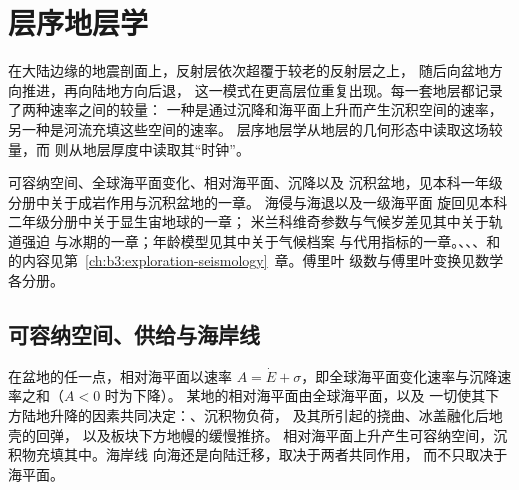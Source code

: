 \chapter{层序地层学}\label{ch:b3:sequence-stratigraphy}

在大陆边缘的地震剖面上，反射层依次超覆于较老的反射层之上，
随后向盆地方向推进，再向陆地方向后退，
这一模式在更高层位重复出现。每一套地层都记录了两种速率之间的较量：
一种是通过沉降和海平面上升而产生沉积空间的速率，
另一种是河流充填这些空间的速率。
层序地层学从地层的几何形态中读取这场较量，而
则从地层厚度中读取其“时钟”。

\begin{recall}
可容纳空间、全球海平面变化、相对海平面、沉降以及
沉积盆地，见本科一年级分册中关于成岩作用与沉积盆地的一章。
海侵与海退以及一级海平面
旋回见本科二年级分册中关于显生宙地球的一章；
米兰科维奇参数与气候岁差见其中关于轨道强迫
与冰期的一章；年龄模型见其中关于气候档案
与代用指标的一章。、、、和的内容见第~\ref{ch:b3:exploration-seismology}~章。傅里叶
级数与傅里叶变换见数学各分册。
\end{recall}

\section{可容纳空间、供给与海岸线}\label{sec:b3:sequence-stratigraphy:shoreline}

在盆地的任一点，相对海平面以速率 $A = \dot E
+ \sigma$，即全球海平面变化速率与沉降速率之和（$A < 0$ 时为下降）。
某地的相对海平面由全球海平面，以及
一切使其下方陆地升降的因素共同决定：、沉积物负荷，
及其所引起的挠曲、冰盖融化后地壳的回弹，
以及板块下方地幔的缓慢推挤。
相对海平面上升产生可容纳空间，沉积物充填其中。海岸线
向海还是向陆迁移，取决于两者共同作用，
而不只取决于海平面。

